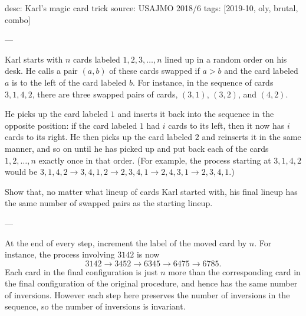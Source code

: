 desc: Karl's magic card trick
source: USAJMO 2018/6
tags: [2019-10, oly, brutal, combo]

---

Karl starts with $n$ cards labeled $1,2,3,\ldots,n$ lined up in a random order on his desk. He calls a pair $(a,b)$ of these cards swapped if $a>b$ and the card labeled $a$ is to the left of the card labeled $b$. For instance, in the sequence of cards $3,1,4,2$, there are three swapped pairs of cards, $(3,1)$, $(3,2)$, and $(4,2)$.

He picks up the card labeled $1$ and inserts it back into the sequence in the opposite position: if the card labeled $1$ had $i$ cards to its left, then it now has $i$ cards to its right. He then picks up the card labeled $2$ and reinserts it in the same manner, and so on until he has picked up and put back each of the cards $1,2,\ldots,n$ exactly once in that order. (For example, the process starting at $3,1,4,2$ would be $3,1,4,2\to3,4,1,2\to2,3,4,1\to2,4,3,1\to2,3,4,1$.)

Show that, no matter what lineup of cards Karl started with, his final lineup has the same number of swapped pairs as the starting lineup.

---

At the end of every step, increment the label of the moved card by $n$. For instance, the process involving $3142$ is now \[3142\to3452\to6345\to6475\to6785.\]
Each card in the final configuration is just $n$ more than the corresponding card in the final configuration of the original procedure, and hence has the same number of inversions. However each step here preserves the number of inversions in the sequence, so the number of inversions is invariant.
